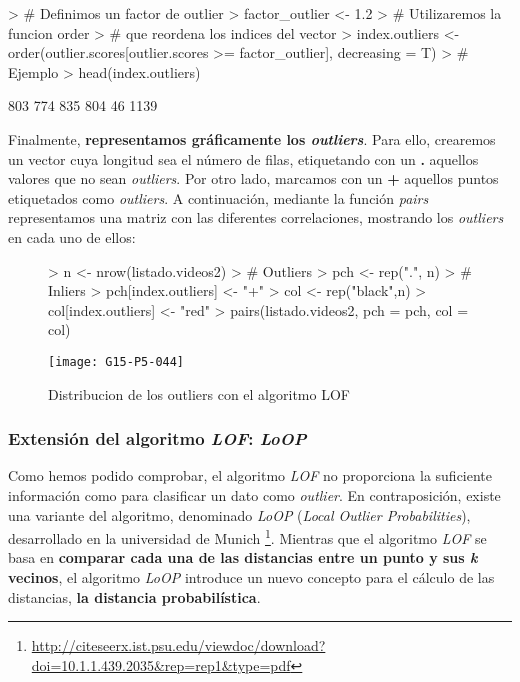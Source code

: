 \documentclass [a4paper] {article}
\begin{document}
\begin{Schunk}
\begin{Sinput}
> # Definimos un factor de outlier
> factor_outlier <- 1.2
> # Utilizaremos la funcion order 
> # que reordena los indices del vector
> index.outliers <- order(outlier.scores[outlier.scores >= factor_outlier], decreasing = T)
> # Ejemplo
> head(index.outliers)
\end{Sinput}
\begin{Soutput}
[1]  803  774  835  804   46 1139
\end{Soutput}
\end{Schunk}

Finalmente, \textbf{representamos gráficamente los \textit{outliers}}. Para ello, crearemos un vector cuya longitud sea el número de filas, etiquetando con un \textbf{.} aquellos valores que no sean \textit{outliers}. Por otro lado, marcamos con un \textbf{+} aquellos puntos etiquetados como \textit{outliers}. A continuación, mediante la función \textit{pairs} representamos una matriz con las diferentes correlaciones, mostrando los \textit{outliers} en cada uno de ellos:
\begin{figure}[htbp!]
\centering
\begin{Schunk}
\begin{Sinput}
> n <- nrow(listado.videos2)
> # Outliers
> pch <- rep(".", n)
> # Inliers
> pch[index.outliers] <- "+"
> col <- rep("black",n)
> col[index.outliers] <- "red"
> pairs(listado.videos2, pch = pch, col = col)
\end{Sinput}
\end{Schunk}
\texttt{[image: G15-P5-044]}
\caption{Distribucion de los outliers con el algoritmo LOF}
\end{figure}

\newpage
\subsubsection{Extensión del algoritmo \textit{LOF}: \textit{LoOP}}
Como hemos podido comprobar, el algoritmo \textit{LOF} no proporciona la suficiente información como para clasificar un dato como \textit{outlier}. En contraposición, existe una variante del algoritmo, denominado \textit{LoOP} (\textit{Local Outlier Probabilities}), desarrollado en la universidad de Munich \footnote{\url{http://citeseerx.ist.psu.edu/viewdoc/download?doi=10.1.1.439.2035&rep=rep1&type=pdf}}. 
Mientras que el algoritmo \textit{LOF} se basa en \textbf{comparar cada una de las distancias entre un punto y sus \textit{k} vecinos}, el algoritmo \textit{LoOP} introduce un nuevo concepto para el cálculo de las distancias, \textbf{la distancia probabilística}.
\end{document}
